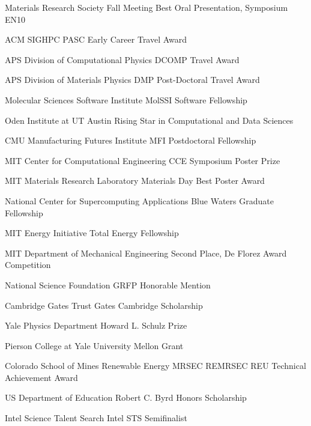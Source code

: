 {Materials Research Society Fall Meeting}
{Best Oral Presentation, Symposium EN10}{}

\datedsubsectionnarrow{}
{ACM SIGHPC}
{PASC Early Career Travel Award}
{}

{APS Division of Computational Physics}
{DCOMP Travel Award}
{}

\datedsubsectionnarrow{}
{APS Division of Materials Physics}
{DMP Post-Doctoral Travel Award}{}

{Molecular Sciences Software Institute}
{MolSSI Software Fellowship}{}

\datedsubsectionnarrow{}
{Oden Institute at UT Austin}
{Rising Star in Computational and Data Sciences}{}

{CMU Manufacturing Futures Institute}
{MFI Postdoctoral Fellowship}{}

\datedsubsectionnarrow{}
{MIT Center for Computational Engineering}
{CCE Symposium Poster Prize}{}

{MIT Materials Research Laboratory}
{Materials Day Best Poster Award}{}

{National Center for Supercomputing Applications}
{Blue Waters Graduate Fellowship}{}

{MIT Energy Initiative}
{Total Energy Fellowship}{}

\datedsubsectionnarrow{}
{MIT Department of Mechanical Engineering}
{Second Place, De Florez Award Competition}{}

{National Science Foundation}
{GRFP Honorable Mention}{}

{Cambridge Gates Trust}
{Gates Cambridge Scholarship}{}

\datedsubsectionnarrow{}
{Yale Physics Department}
{Howard L. Schulz Prize}{}

{Pierson College at Yale University}
{Mellon Grant}{}

\datedsubsectionnarrow{}
{Colorado School of Mines Renewable Energy MRSEC}
{REMRSEC REU Technical Achievement Award}{}

{US Department of Education}
{Robert C. Byrd Honors Scholarship}{}

\datedsubsectionnarrow{}
{Intel Science Talent Search}
{Intel STS Semifinalist}{}
